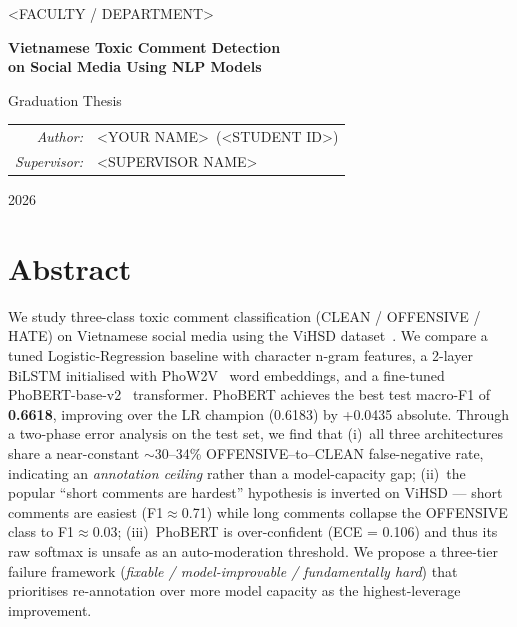 \documentclass[a4paper,12pt,oneside]{report}
\title{\thesistitle}
\author{\thesisauthor}
\date{\thesisyear}
\newcommand{\thesistitle}{Vietnamese Toxic Comment Detection\\ on Social Media Using NLP Models}
\newcommand{\thesisauthor}{<YOUR NAME>}
\newcommand{\thesisid}{<STUDENT ID>}
\newcommand{\thesissupervisor}{<SUPERVISOR NAME>}
\newcommand{\thesisuniversity}{<UNIVERSITY NAME>}
\newcommand{\thesisfaculty}{<FACULTY / DEPARTMENT>}
\newcommand{\thesisyear}{2026}
\begin{document}
\begin{titlepage}
\centering
{\large \thesisuniversity \par}
{\large \thesisfaculty \par}
\vspace{2.5cm}
{\Huge \bfseries \thesistitle \par}
\vspace{1.5cm}
{\Large Graduation Thesis \par}
\vspace{3cm}
\begin{tabular}{rl}
\textit{Author:}     & \thesisauthor\ (\thesisid) \\[4pt]
\textit{Supervisor:} & \thesissupervisor \\
\end{tabular}
\vfill
{\large \thesisyear \par}
\end{titlepage}

\chapter*{Abstract}

We study three-class toxic comment classification (CLEAN / OFFENSIVE / HATE)
on Vietnamese social media using the ViHSD dataset~\cite{luu2021vihsd}.
We compare a tuned Logistic-Regression baseline with character n-gram
features, a 2-layer BiLSTM initialised with PhoW2V~\cite{nguyen2020phow2v}
word embeddings, and a fine-tuned PhoBERT-base-v2~\cite{nguyen2020phobert}
transformer. PhoBERT achieves the best test macro-F1 of \textbf{0.6618},
improving over the LR champion (0.6183) by +0.0435 absolute. Through a
two-phase error analysis on the test set, we find that
(i)~all three architectures share a near-constant
$\sim$30--34\% OFFENSIVE--to--CLEAN false-negative rate, indicating an
\emph{annotation ceiling} rather than a model-capacity gap;
(ii)~the popular ``short comments are hardest'' hypothesis is inverted on
ViHSD --- short comments are easiest (F1$\approx$0.71) while long comments
collapse the OFFENSIVE class to F1$\approx$0.03;
(iii)~PhoBERT is over-confident
(ECE = 0.106) and thus its raw softmax is unsafe as an auto-moderation
threshold. We propose a three-tier failure framework
(\emph{fixable / model-improvable / fundamentally hard}) that prioritises
re-annotation over more model capacity as the highest-leverage
improvement.
\end{document}
